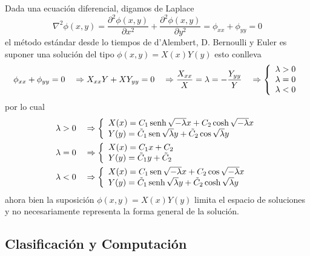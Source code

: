 \documentclass[spanish,titlepage,11pt]{article}
\begin{document}
Dada una ecuaci\'{o}n diferencial, digamos de Laplace
\[
\nabla^{2}\phi\left(  x,y\right)  =\frac{\partial^{2}\phi\left(  x,y\right)
}{\partial x^{2}}+\frac{\partial^{2}\phi\left(  x,y\right)  }{\partial y^{2}%
}=\phi_{xx}+\phi_{yy}=0
\]
el m\'{e}todo est\'{a}ndar desde lo tiempos de d'Alembert, D. Bernoulli y
Euler es suponer una soluci\'{o}n del tipo $\phi\left(  x,y\right)  =X\left(
x\right)  Y\left(  y\right)  $ esto conlleva
\[
\phi_{xx}+\phi_{yy}=0\quad\Rightarrow X_{xx}Y+XY_{yy}=0\quad\Rightarrow
\dfrac{X_{xx}}{X}=\lambda=-\dfrac{Y_{yy}}{Y}\quad\Rightarrow\left\{
\begin{array}
[c]{c}%
\lambda>0\\
\lambda=0\\
\lambda<0
\end{array}
\right.
\]
por lo cual
\begin{align*}
\lambda &  >0\quad\Rightarrow\left\{
\begin{array}
[c]{l}%
X(x)=C_{1}\operatorname*{senh}\sqrt{-\lambda}x+C_{2}\cosh\sqrt{-\lambda}x\\
Y(y)=\tilde{C}_{1}\operatorname*{sen}\sqrt{\lambda}y+\tilde{C}_{2}\cos
\sqrt{\lambda}y
\end{array}
\right. \\
\lambda &  =0\quad\Rightarrow\left\{
\begin{array}
[c]{l}%
X(x)=C_{1}x+C_{2}\\
Y(y)=\tilde{C}_{1}y+\tilde{C}_{2}%
\end{array}
\right. \\
\lambda &  <0\quad\Rightarrow\left\{
\begin{array}
[c]{l}%
X(x)=C_{1}\operatorname*{sen}\sqrt{-\lambda}x+C_{2}\cos\sqrt{-\lambda}x\\
Y(y)=\tilde{C}_{1}\operatorname*{senh}\sqrt{\lambda}y+\tilde{C}_{2}\cosh
\sqrt{\lambda}y
\end{array}
\right.
\end{align*}
ahora bien la suposici\'{o}n $\phi\left(  x,y\right)  =X\left(  x\right)
Y\left(  y\right)  $ limita el espacio de soluciones y no necesariamente
representa la forma general de la soluci\'{o}n.

\subsection{Clasificaci\'{o}n y Computaci\'{o}n}
\end{document}
